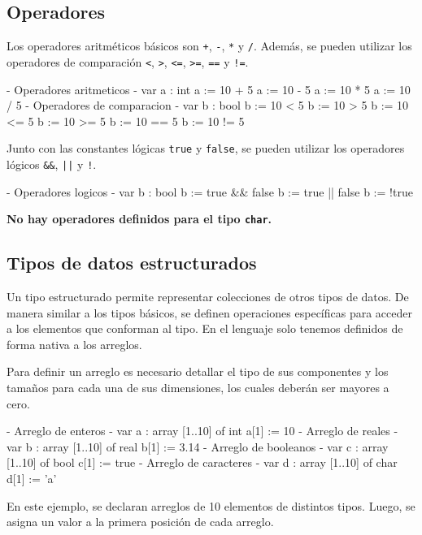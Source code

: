 \subsection{Operadores}
Los operadores aritméticos básicos son \texttt{+}, \texttt{-}, \texttt{*} y \texttt{/}. Además, se pueden utilizar los operadores de comparación \texttt{<}, \texttt{>}, \texttt{<=}, \texttt{>=}, \texttt{==} y \texttt{!=}.
\begin{pascallike}
    {- Operadores aritmeticos -}
    var a : int
    a := 10 + 5
    a := 10 - 5
    a := 10 * 5
    a := 10 / 5
    {- Operadores de comparacion -}
    var b : bool
    b := 10 < 5
    b := 10 > 5
    b := 10 <= 5
    b := 10 >= 5
    b := 10 == 5
    b := 10 != 5
\end{pascallike}
Junto con las constantes lógicas \texttt{true} y \texttt{false}, se pueden utilizar los operadores lógicos \texttt{\&\&}, \texttt{||} y \texttt{!}.
\begin{pascallike}
    {- Operadores logicos -}
    var b : bool
    b := true && false
    b := true || false
    b := !true
\end{pascallike}

\textbf{No hay operadores definidos para el tipo \texttt{char}.}

\subsection{Tipos de datos estructurados}
Un tipo estructurado permite representar colecciones de otros tipos de datos. De manera similar a los tipos básicos, se definen operaciones específicas para acceder a los elementos que conforman al tipo. En el lenguaje solo tenemos definidos de forma nativa a los arreglos.

Para definir un arreglo es necesario detallar el tipo de sus componentes y los tamaños para cada una de sus dimensiones, los cuales deberán ser mayores a cero.

\begin{pascallike}
    {- Arreglo de enteros -}
    var a : array [1..10] of int
    a[1] := 10
    {- Arreglo de reales -}
    var b : array [1..10] of real
    b[1] := 3.14
    {- Arreglo de booleanos -}
    var c : array [1..10] of bool
    c[1] := true
    {- Arreglo de caracteres -}
    var d : array [1..10] of char
    d[1] := 'a'
\end{pascallike}
En este ejemplo, se declaran arreglos de 10 elementos de distintos tipos. Luego, se asigna un valor a la primera posición de cada arreglo.

